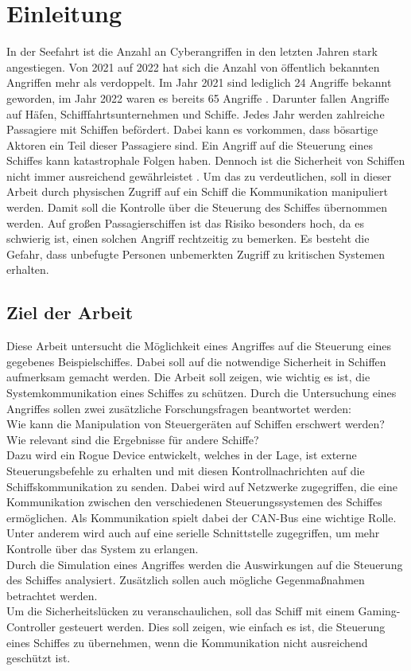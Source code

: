 \chapter{Einleitung}

In der Seefahrt ist die Anzahl an Cyberangriffen in den letzten Jahren stark angestiegen. Von 2021 auf 2022 hat sich die Anzahl von öffentlich
bekannten Angriffen mehr als verdoppelt. Im Jahr 2021 sind lediglich 24 Angriffe bekannt geworden, im Jahr 2022 waren es bereits 65 Angriffe 
\cite{mcad}. Darunter fallen Angriffe auf Häfen, Schifffahrtsunternehmen und Schiffe.
Jedes Jahr werden zahlreiche Passagiere mit Schiffen befördert. Dabei kann es vorkommen, dass bösartige Aktoren ein Teil dieser Passagiere sind.
Ein Angriff auf die Steuerung eines Schiffes kann katastrophale Folgen haben. Dennoch ist die Sicherheit von Schiffen nicht 
immer ausreichend gewährleistet \cite{Reilly2016}.
Um das zu verdeutlichen, soll in dieser Arbeit durch physischen Zugriff auf ein Schiff die Kommunikation manipuliert werden.
Damit soll die Kontrolle über die Steuerung des Schiffes übernommen werden. 
Auf großen Passagierschiffen ist das Risiko besonders hoch, da es
schwierig ist, einen solchen Angriff rechtzeitig zu bemerken. Es besteht die Gefahr, 
dass unbefugte Personen unbemerkten Zugriff zu kritischen Systemen erhalten. \\

\section{Ziel der Arbeit}
Diese Arbeit untersucht die Möglichkeit eines Angriffes auf die Steuerung eines gegebenes Beispielschiffes.
Dabei soll auf die notwendige Sicherheit in Schiffen aufmerksam gemacht werden.
Die Arbeit soll zeigen, wie wichtig es ist, die Systemkommunikation eines Schiffes zu schützen.
Durch die Untersuchung eines Angriffes sollen zwei zusätzliche Forschungsfragen beantwortet werden: \\
Wie kann die Manipulation von Steuergeräten auf Schiffen erschwert werden? \\
Wie relevant sind die Ergebnisse für andere Schiffe? \\
Dazu wird ein Rogue Device entwickelt, welches in der 
Lage, ist externe Steuerungsbefehle zu erhalten und mit diesen Kontrollnachrichten auf die Schiffskommunikation zu senden.
Dabei wird auf Netzwerke zugegriffen, die eine Kommunikation zwischen den verschiedenen Steuerungssystemen des Schiffes 
ermöglichen. Als Kommunikation spielt dabei der CAN-Bus eine wichtige Rolle.
Unter anderem wird auch 
auf eine serielle Schnittstelle zugegriffen, um mehr Kontrolle über das System zu erlangen. \\
Durch die Simulation eines Angriffes werden die Auswirkungen auf die Steuerung des 
Schiffes analysiert. Zusätzlich 
sollen auch mögliche Gegenmaßnahmen betrachtet werden. \\
Um die Sicherheitslücken zu veranschaulichen, soll das Schiff mit einem Gaming-Controller gesteuert werden.
Dies soll zeigen, wie einfach es ist, die Steuerung eines Schiffes zu übernehmen, wenn die Kommunikation nicht 
ausreichend geschützt ist.\\

